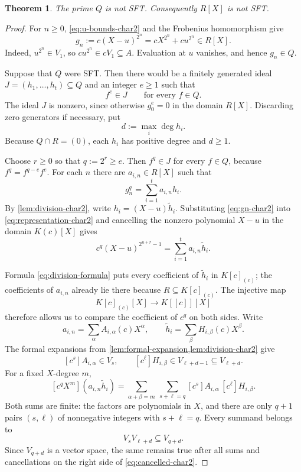 \documentclass[11pt,reqno]{amsart}
\numberwithin{equation}{section}
\theoremstyle{plain}
\newtheorem{theorem}{Theorem}[section]
\theoremstyle{definition}
\theoremstyle{remark}
\begin{document}
\begin{theorem}\label{thm:Q-not-sft}
The prime $Q$ is not SFT.  Consequently $R[X]$ is not SFT.
\end{theorem}

\begin{proof}
For $n\geq0$, \eqref{eq:u-bounds-char2} and the Frobenius homomorphism give
\begin{equation}\label{eq:gn-char2}
  g_n:=c(X-u)^{2^n}=cX^{2^n}+cu^{2^n}\in R[X].
\end{equation}
Indeed, $u^{2^n}\in V_1$, so $cu^{2^n}\in cV_1\subseteq A$.
Evaluation at $u$ vanishes, and hence $g_n\in Q$.

Suppose that $Q$ were SFT.  Then there would be a finitely generated ideal
$J=(h_1,\ldots,h_t)\subseteq Q$ and an integer $e\geq1$ such that
\begin{equation}\label{eq:sft-assumption}
  f^e\in J\qquad\text{for every }f\in Q.
\end{equation}
The ideal $J$ is nonzero, since otherwise $g_0^e=0$ in the domain $R[X]$.
Discarding zero generators if necessary, put
\[
  d:=\max_i\deg h_i.
\]
Because $Q\cap R=(0)$, each $h_i$ has positive degree and $d\geq1$.

Choose $r\geq0$ so that $q:=2^r\geq e$.  Then $f^q\in J$ for every
$f\in Q$, because $f^q=f^{q-e}f^e$.  For each $n$ there are
$a_{i,n}\in R[X]$ such that
\begin{equation}\label{eq:representation-char2}
  g_n^q=\sum_{i=1}^ta_{i,n}h_i.
\end{equation}
By \cref{lem:division-char2}, write
$h_i=(X-u)\widetilde h_i$.  Substituting \eqref{eq:gn-char2} into
\eqref{eq:representation-char2} and cancelling the nonzero polynomial
$X-u$ in the domain $K(c)[X]$ gives
\begin{equation}\label{eq:cancelled-char2}
  c^q(X-u)^{2^{n+r}-1}
    =\sum_{i=1}^ta_{i,n}\widetilde h_i.
\end{equation}

Formula \eqref{eq:division-formula} puts every coefficient of
$\widetilde h_i$ in $K[c]_{(c)}$; the coefficients of $a_{i,n}$ already
lie there because $R\subseteq K[c]_{(c)}$.  The injective map
\[
  K[c]_{(c)}[X]\longrightarrow K[[c]][X]
\]
therefore allows us to compare the coefficient of $c^q$ on both sides.
Write
\[
  a_{i,n}=\sum_\alpha A_{i,\alpha}(c)X^\alpha,
  \qquad
  \widetilde h_i=\sum_\beta H_{i,\beta}(c)X^\beta.
\]
The formal expansions from
\cref{lem:formal-expansion,lem:division-char2} give
\[
  [c^s]A_{i,\alpha}\in V_s,
  \qquad [c^\ell]H_{i,\beta}\in V_{\ell+d-1}\subseteq V_{\ell+d}.
\]
For a fixed $X$-degree $m$,
\begin{equation}\label{eq:convolution-char2}
 [c^qX^m](a_{i,n}\widetilde h_i)
 =\sum_{\alpha+\beta=m}\ \sum_{s+\ell=q}
   [c^s]A_{i,\alpha}\,[c^\ell]H_{i,\beta}.
\end{equation}
Both sums are finite: the factors are polynomials in $X$, and there are only
$q+1$ pairs $(s,\ell)$ of nonnegative integers with $s+\ell=q$.  Every
summand belongs to
\[
  V_sV_{\ell+d}\subseteq V_{q+d}.
\]
Since $V_{q+d}$ is a vector space, the same remains true after all sums and
cancellations on the right side of \eqref{eq:cancelled-char2}.


\end{proof}
\end{document}
